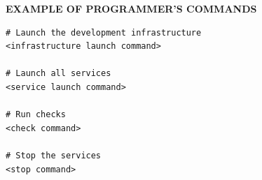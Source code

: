 \documentclass[12pt,a4paper]{extarticle}
\begin{document}
\begin{center}
\textbf{EXAMPLE OF PROGRAMMER'S COMMANDS}
\end{center}

\begin{verbatim}
# Launch the development infrastructure
<infrastructure launch command>

# Launch all services
<service launch command>

# Run checks
<check command>

# Stop the services
<stop command>
\end{verbatim}

\clearpage



\end{document}
